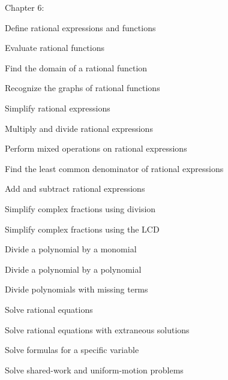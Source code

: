 Chapter 6:
\begin{alphalist}
    \item Define rational expressions and functions
    \item Evaluate rational functions
    \item Find the domain of a rational function
    \item Recognize the graphs of rational functions
    \item Simplify rational expressions
    \item Multiply and divide rational expressions
    \item Perform mixed operations on rational expressions
    \item Find the least common denominator of rational expressions
    \item Add and subtract rational expressions
    \item Simplify complex fractions using division
    \item Simplify complex fractions using the LCD
    \item Divide a polynomial by a monomial
    \item Divide a polynomial by a polynomial
    \item Divide polynomials with missing terms 
    \item Solve rational equations
    \item Solve rational equations with extraneous solutions
    \item Solve formulas for a specific variable
    \item Solve shared-work and uniform-motion problems
\end{alphalist}

